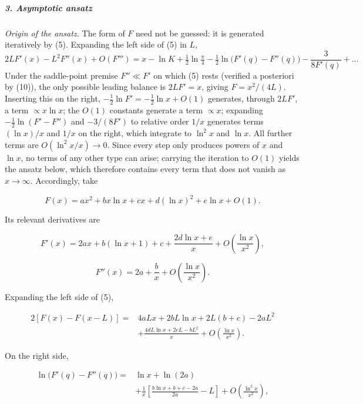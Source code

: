 \subparagraph*{3. Asymptotic ansatz}

{\color{blue}
\emph{Origin of the ansatz.} The form of $F$ need not be guessed: it is generated iteratively by (5). Expanding the left side of (5) in $L$,
\[
2L F'(x)-L^2F''(x)+O(F''') = x-\ln K+\tfrac12\ln\tfrac{\pi}{4}-\tfrac12\ln\bigl(F'(q)-F''(q)\bigr)-\frac{3}{8F'(q)}+\dots
\]
Under the saddle-point premise $F''\ll F'$ on which (5) rests (verified a posteriori by (10)), the only possible leading balance is $2LF'=x$, giving $F=x^2/(4L)$. Inserting this on the right, $-\tfrac12\ln F'=-\tfrac12\ln x+O(1)$ generates, through $2LF'$, a term $\propto x\ln x$; the $O(1)$ constants generate a term $\propto x$; expanding $-\tfrac12\ln(F'-F'')$ and $-3/(8F')$ to relative order $1/x$ generates terms $(\ln x)/x$ and $1/x$ on the right, which integrate to $\ln^2x$ and $\ln x$. All further terms are $O(\ln^2x/x)\to0$. Since every step only produces powers of $x$ and $\ln x$, no terms of any other type can arise; carrying the iteration to $O(1)$ yields the ansatz below, which therefore contains every term that does not vanish as $x\to\infty$.
}
{\color{blue}Accordingly, take}

\[
F(x) = ax^2+bx\ln x+cx +d(\ln x)^2+e\ln x+O(1). \tag{6}
\]

Its relevant derivatives are

\[
F'(x) = 2ax+b(\ln x+1)+c +\frac{2d\ln x+e}{x} +O\!\left(\frac{\ln x}{x^2}\right),
\]

\[
F''(x) = 2a+\frac{b}{x} +O\!\left(\frac{\ln x}{x^2}\right).
\]

Expanding the left side of (5),

\begin{equation}
\begin{aligned}
2[F(x)-F(x-L)]
={}&4aLx+2bL\ln x
+2L(b+c)-2aL^2\\
&+\frac{4dL\ln x+2eL-bL^2}{x}
+O\!\left(\frac{\ln x}{x^2}\right).
\end{aligned}
\tag{7}
\end{equation}

On the right side,

\begin{equation}
\begin{aligned}
\ln\!\bigl(F'(q)-F''(q)\bigr)
={}&\ln x+\ln(2a)\\
&+\frac{1}{x}
\left[
\frac{b\ln x+b+c-2a}{2a}-L
\right]
+O\!\left(\frac{\ln^2x}{x^2}\right),
\end{aligned}
\tag{8}
\end{equation}

